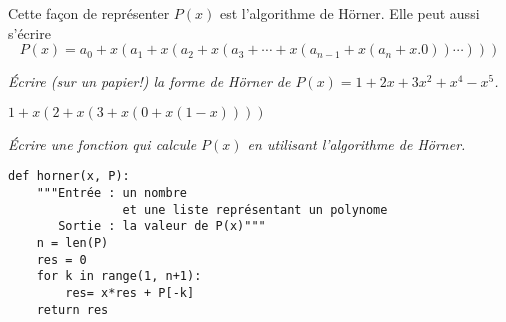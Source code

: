Cette façon de représenter $P(x)$ est l'algorithme de Hörner. Elle peut aussi s'écrire
\[ P(x)=a_0+x(a_1+x(a_2+x(a_3+\cdots +x(a_{n-1}+x(a_n+x.0))\cdots)))\]
\begin{Exercise}\it
Écrire (sur un papier!) la forme de Hörner de $P(x)=1+2x+3x^2+x^4-x^5$.
\end{Exercise} 
\begin{Answer}

$1+x(2+x(3+x(0+x(1-x))))$
\newpage
\end{Answer}  
\begin{Exercise}\it
Écrire une fonction  qui calcule $P(x)$ en utilisant l'algorithme de Hörner.
\end{Exercise} 
\begin{Answer}
\begin{lstlisting}
def horner(x, P):
    """Entrée : un nombre 
                et une liste représentant un polynome
       Sortie : la valeur de P(x)"""
    n = len(P)
    res = 0
    for k in range(1, n+1):
        res= x*res + P[-k]
    return res 
\end{lstlisting}
\end{Answer}  
